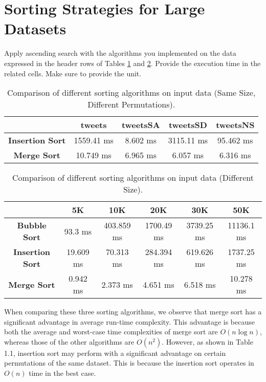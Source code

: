 \label{implementation}

\section{Sorting Strategies for Large Datasets}

Apply ascending search with the algorithms you implemented on the data expressed in the header rows of Tables \ref{dataPermutation} and \ref{dataSize}. Provide the execution time in the related cells. Make sure to provide the unit. 

\begin{table}[h!]
\centering
\begin{tabular}{|c|c|c|c|c|}
\hline
& \textbf{tweets} & \textbf{tweetsSA} & \textbf{tweetsSD} & \textbf{tweetsNS} \\ \hline
\textbf{Insertion Sort} & 1559.41 ms & 8.602 ms & 3115.11 ms & 95.462 ms \\ \hline
\textbf{Merge Sort} & 10.749 ms & 6.965 ms & 6.057 ms & 6.316 ms \\ \hline

\end{tabular}
\caption{Comparison of different sorting algorithms on input data (Same Size, Different Permutations). }
\label{dataPermutation}
\end{table}

\begin{table}[h!]
\centering
\begin{tabular}{|c|c|c|c|c|c|}
\hline
& \textbf{5K} & \textbf{10K} & \textbf{20K} & \textbf{30K} & \textbf{50K} \\ \hline
\textbf{Bubble Sort} & 93.3 ms & 403.859 ms & 1700.49 ms & 3739.25 ms & 11136.1 ms \\ \hline
\textbf{Insertion Sort} & 19.609 ms & 70.313 ms & 284.394 ms & 619.626 ms & 1737.25 ms \\ \hline
\textbf{Merge Sort} & 0.942 ms & 2.373 ms & 4.651 ms & 6.518 ms & 10.278 ms \\ \hline
\end{tabular}
\caption{Comparison of different sorting algorithms on input data (Different Size). }
\label{dataSize}
\end{table}

When comparing these three sorting algorithms, we observe that merge sort has a significant advantage in average run-time complexity. This advantage is because both the average and worst-case time complexities of merge sort are \(O(n \log n)\), whereas those of the other algorithms are \(O(n^2)\). However, as shown in Table 1.1, insertion sort may perform with a significant advantage on certain permutations of the same dataset. This is because the insertion sort operates in \(O(n)\) time in the best case.

